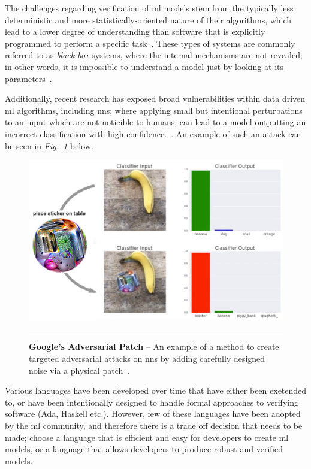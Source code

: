 The challenges regarding verification of \gls{ml} models stem from the typically less deterministic and more statistically-oriented nature of their algorithms, which
lead to a lower degree of understanding than software that is explicitly programmed to perform a specific task~\citep{bishop}. These types of systems are
commonly referred to as \textit{black box} systems, where the internal mechanisms are not revealed; in other words, it is impossible to understand a model just by
looking at its parameters~\citep{molnar2019}.

Additionally, recent research has exposed broad vulnerabilities within data driven \gls{ml} algorithms, including \Glspl{nn}; where applying 
small but intentional perturbations to an input which are not noticible to humans,
can lead to a model outputting an incorrect classification with high confidence.~\citep{goodfellow}.
An example of such an attack can be seen in \textit{Fig.~\ref{fig:adversarialpatch}} below.

\begin{figure}[H]
	\centering
        \includegraphics[width=1.0\textwidth]{media/introduction/sticker.png}
        \rule{35em}{0.5pt}
        \caption[Google's Aversarial Patch]{\textbf{Google's Adversarial Patch} -- An example of a method to create targeted adversarial attacks on \glspl{nn} by adding carefully designed noise via a physical patch~\citep{brown2018}.}\label{fig:adversarialpatch}
\end{figure}

Various languages have been developed over time that have either been exetended to, or have been intentionally designed to handle formal
approaches to verifying software (Ada, Haskell etc.). However, few of these languages have been adopted by the \gls{ml} community, and therefore
there is a trade off decision that needs to be made; choose a language that is efficient and easy for developers to create \gls{ml} models,
or a language that allows developers to produce robust and verified models.

